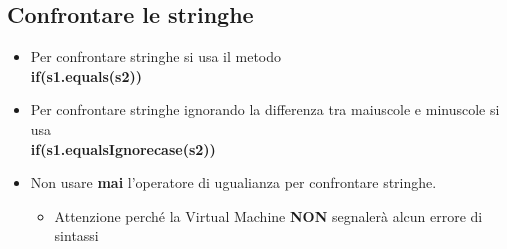 \subsection*{Confrontare le stringhe}
\begin{frame}
\begin{block}{}
\begin{itemize}
\item Per confrontare stringhe si usa il metodo \textbf{}\\
\hspace{0.7cm}\textbf{if(s1.\textbf{\alert{equals(s2)}})}
\item Per confrontare stringhe ignorando la differenza tra maiuscole e minuscole si usa \textbf{}\\
\hspace{0.7cm}\textbf{if(s1.\textbf{\alert{equalsIgnorecase(s2)}})}
\item Non usare \textbf{\alert{mai}} l'operatore di ugualianza per confrontare stringhe. \textbf{}
\begin{itemize}
\item Attenzione perché la Virtual Machine \textbf{\alert{NON}} segnalerà alcun errore di sintassi
\end{itemize}
\end{itemize}
\end{block}
\end{frame}

